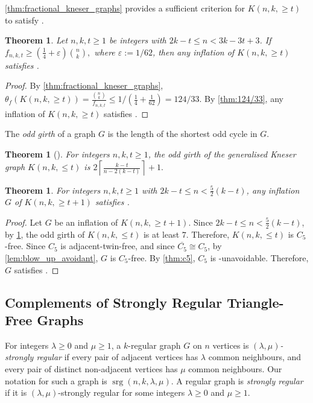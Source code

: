\documentclass[11pt]{article}
\numberwithin{equation}{section}
\theoremstyle{plain}
\newtheorem{thm}[equation]{Theorem}
\theoremstyle{definition}
\renewcommand{\geq}{\geqslant}
\renewcommand{\leq}{\leqslant}
\DeclareMathOperator{\srg}{srg}
\newcommand{\defn}[1]{\textcolor{green!50!black}{\textit{#1}}}
\begin{document}
\cref{thm:fractional_kneser_graphs} provides a sufficient criterion for $K(n, k, \geq t)$ to satisfy .

\begin{thm}
    \label{thm:generalised_kneser_graphs}
    Let $n, k, t \geq 1$ be integers with $2k - t \leq n < 3k - 3t + 3$. If
    $
        f_{n,k,t} \geq \left(\frac{1}{4}  + \varepsilon\right) \binom{n}{k},
    $
    where $\varepsilon:=1/62$, then any inflation of $K(n, k, \geq t)$ satisfies .
\end{thm}
\begin{proof}
    By \cref{thm:fractional_kneser_graphs}, $\theta_f(K(n,k,\geq t)) = \frac{\binom{n}{k}}{f_{n,k,t}} \leq 1/(\frac{1}{4} + \frac{1}{62}) = 124/33$. By \cref{thm:124/33}, any inflation of $K(n, k, \geq t)$ satisfies .
\end{proof}
The \defn{odd girth} of a graph $G$ is the length of the shortest odd cycle in $G$.
\begin{thm}[\citet{denley1997odd}]
    \label{thm:odd_girth_of_kneser_graph}
    For integers $n, k, t \geq 1$, the odd girth of the generalised Kneser graph $K(n,k, \leq t)$ is
    $
        2 \left\lceil\frac{k-t}{n - 2(k-t)} \right\rceil + 1.
    $
\end{thm}
\begin{thm}
    \label{thm:generalised_kneser_graphs2}
    For integers $n,k,t \geq 1$ with $2k - t \leq n < \frac{5}{2} (k-t)$, any inflation $G$ of $K(n, k,\geq t+1)$ satisfies .
\end{thm}
\begin{proof}
    Let $G$ be an inflation of $K(n, k,\geq t+1)$.
    Since $2k - t \leq n < \frac{5}{2} (k-t)$, by \cref{thm:odd_girth_of_kneser_graph}, the odd girth of $K(n,k, \leq t)$ is at least $7$. Therefore, $K(n, k,\leq t)$ is $C_5$-free. Since $C_5$ is adjacent-twin-free, and since $\overline{C_5} \cong C_5$, by \cref{lem:blow_up_avoidant}, $G$ is $C_5$-free. By \cref{thm:c5}, $C_5$ is -unavoidable. Therefore, $G$ satisfies .
\end{proof}

\subsection{Complements of Strongly Regular Triangle-Free Graphs}
\label{ss:srg}
For integers $\lambda \geq 0$ and $\mu \geq 1$, a $k$-regular graph $G$ on $n$ vertices is \defn{$(\lambda ,\mu)$-strongly regular} if every pair of adjacent vertices has $\lambda$ common neighbours, and every pair of distinct non-adjacent vertices has $\mu$ common neighbours. Our notation for such a graph is \defn{$\srg(n, k, \lambda, \mu)$}. A regular graph is \defn{strongly regular} if it is $(\lambda, \mu)$-strongly regular for some integers $\lambda \geq 0$ and $\mu \geq 1$.
\end{document}
